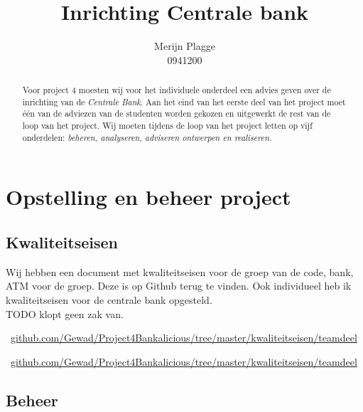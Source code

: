 \documentclass{article}
\begin{document}
\title{\huge{Inrichting Centrale bank} }
\author{Merijn Plagge \\ 0941200}

\maketitle

\begin{abstract}

Voor project 4 moesten wij voor het individuele onderdeel een advies geven over de inrichting van de \emph{Centrale Bank}.
Aan het eind van het eerste deel van het project moet \'e\'en van de adviezen van de studenten worden gekozen en uitgewerkt de rest van de loop van het project.
Wij moeten tijdens de loop van het project letten op vijf onderdelen: \emph{beheren, analyseren, adviseren ontwerpen en realiseren.}


\end{abstract}

\newpage

\tableofcontents

\newpage

\section{Opstelling en beheer project}

\subsection{Kwaliteitseisen}

Wij hebben een document met kwaliteitseisen voor de groep van de code, bank, ATM voor de groep.
Deze is op Github terug te vinden.
Ook individueel heb ik kwaliteitseisen voor de centrale bank opgesteld. \\


TODO klopt geen zak van.


\vspace{1mm}
\Mundus~\url{github.com/Gewad/Project4Bankalicious/tree/master/kwaliteitseisen/teamdeel}

\Mundus~\url{github.com/Gewad/Project4Bankalicious/tree/master/kwaliteitseisen/teamdeel}

\subsection{Beheer}
\end{document}

